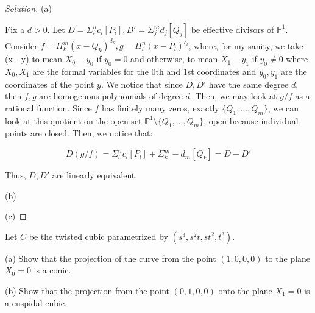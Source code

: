 \documentclass[10pt]{article}
\newenvironment{problem}[2][Problem]{\begin{trivlist}
\item[\hskip \labelsep {\bfseries #1}\hskip \labelsep {\bfseries #2.}]}{\end{trivlist}}
\begin{document}
\begin{proof}[Solution]

(a)

Fix a $d > 0$. Let $D = \Sigma_i^n c_i [P_i], D' = \Sigma_j^m d_j [Q_j]$ be effective divisors of $\mathbb{P}^1$. Consider $f = \Pi_k^{m} (x-Q_k)^{d_k}, g = \Pi_l^n (x-P_l)^{c_l}$, where, for my sanity, we take (x - y) to mean $X_0 - y_0$ if $y_0 = 0$ and otherwise, to mean $X_1 - y_1$ if $y_0 \not = 0$ where $X_0,X_1$ are the formal variables for the 0th and 1st coordinates and $y_0,y_1$ are the coordinates of the point $y$. We notice that since $D, D'$ have the same degree $d$, then $f,g$ are homogenous polynomials of degree $d$. Then, we may look at $g/f$ as a rational function. Since $f$ has finitely many zeros, exactly $\{ Q_1,...,Q_m \}$, we can look at this quotient on the open set $\mathbb{P}^1 \setminus \{ Q_1,...,Q_m \}$, open because individual points are closed. Then, we notice that:

$$D(g/f) = \Sigma_l^n c_l [P_l ] + \Sigma_k^m -d_m [Q_k] = D - D'$$

Thus, $D, D'$ are linearly equivalent.

(b)

(c)


\end{proof}

\begin{problem}{10.3}

Let $C$ be the twisted cubic parametrized by $(s^3, s^2t, st^2, t^3)$.

(a) Show that the projection of the curve from the point $(1,0,0,0)$ to the plane $X_0 = 0$ is a conic.

(b) Show that the projection from the point $(0,1,0,0)$ onto the plane $X_1 = 0$ is a cuspidal cubic.

\end{problem}
\end{document}
